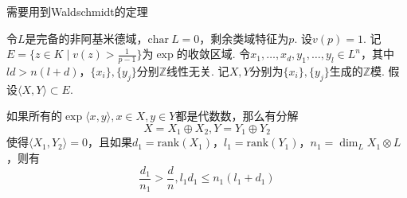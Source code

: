 需要用到Waldschmidt的定理
\begin{cthm}
    令$L$是完备的非阿基米德域，$\mathrm{char}\ L = 0$，剩余类域特征为$p$. 设$v(p) = 1$. 记$E=\{z\in K\mid v(z) > \frac{1}{p-1}\}$为$\exp$的收敛区域. 令$x_1,\ldots,x_d,y_1,\ldots,y_l\in L^n$，其中$ld>n(l+d)$，$\{x_i\}, \{y_j\}$分别$\mathbb{Z}$线性无关. 记$X,Y$分别为$\{x_i\}, \{y_j\}$生成的$\mathbb{Z}$模. 假设$\langle X, Y\rangle \subset E$.

    如果所有的$\exp \langle x, y\rangle, x\in X, y\in Y$都是代数数，那么有分解
    \begin{equation}
        X = X_1\oplus X_2, Y=Y_1\oplus Y_2
    \end{equation}
    使得$\langle X_1, Y_2\rangle = 0$，且如果$d_1 = \mathrm{rank}(X_1)$，$l_1 = \mathrm{rank}(Y_1)$，$n_1 = \dim_L X_1\otimes L$，则有
    \begin{equation}
        \frac{d_1}{n_1} > \frac{d}{n}, l_1d_1\leq n_1(l_1+d_1)
    \end{equation}
\end{cthm}

